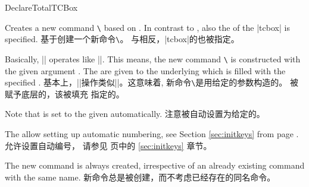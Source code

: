 \begin{docCommand}{DeclareTotalTCBox}{}

\begin{stripedbox}
Creates a new command \texttt{\textbackslash} based on .
In contrast to , also the  of the |tcbox| is specified.
\tcblower
基于创建一个新命令\texttt{\textbackslash}。%
与相反，|tcbox|的也被指定。
\end{stripedbox}

\begin{stripedbox}
Basically, |\DeclareTotalTCBox| operates like |\DeclareDocumentCommand|. This means,
the new command \texttt{\textbackslash} is constructed with the given argument .
The  are given to the underlying  which is filled with
the specified .
\tcblower
基本上，|\DeclareTotalTCBox|操作类似|\DeclareDocumentCommand|。这意味着,
新命令\texttt{\textbackslash}是用给定的参数构造的。
被赋予底层的，该被填充
指定的。
\end{stripedbox}
  

\begin{stripedbox}
Note that  is set to the given 
automatically.
\tcblower
注意被自动设置为给定的。
\end{stripedbox}


\begin{stripedbox}
The  allow setting up automatic numbering,
see Section \ref{sec:initkeys} from page \pageref{sec:initkeys}.
\tcblower
{}允许设置自动编号，
请参见 \pageref{sec:initkeys} 页中的 \ref{sec:initkeys} 章节。
\end{stripedbox}


\begin{stripedbox}
The new command is always created, irrespective of an already existing
command with the same name.
\tcblower
新命令总是被创建，而不考虑已经存在的同名命令。
\end{stripedbox}

\end{docCommand}

